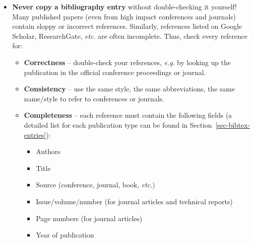 \documentclass[11pt,a4paper]{article}
\begin{document}
\begin{itemize}
\item \textbf{Never copy a bibliography entry} without double-checking it yourself! Many published papers (even from high impact conferences and journals) contain sloppy or incorrect references. Similarly, references listed on Google Scholar, ResearchGate, \emph{etc.} are often incomplete. Thus, check every reference for:
%
\vspace{-0.25cm}
%
\begin{itemize}
\item \textbf{Correctness} -- double-check your references, \emph{e.g.} by looking up the publication in the official conference proceedings or journal.
\item \textbf{Consistency} -- use the same style, the same abbreviations, the same name/style to refer to conferences or journals.
\item \textbf{Completeness} -- each reference must contain the following fields (a detailed list for each publication type can be found in Section~\ref{sec-bibtex-entries}):
%
%
\begin{itemize}[label=$\bullet$]
\item Authors
\item Title
\item Source (conference, journal, book, \emph{etc.})
\item Issue/volume/number (for journal articles and technical reports)
\item Page numbers (for journal articles)
\item Year of publication
\end{itemize}
\end{itemize}






\end{itemize}
\end{document}
